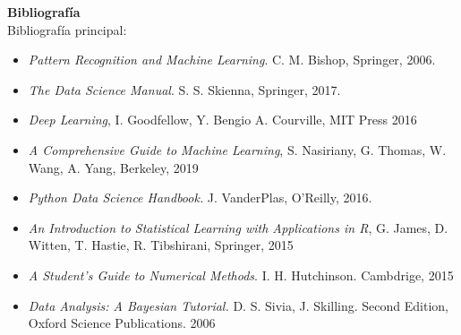 \documentclass[letterpaper,10pt,onecolumn]{article}
\begin{document}
\vspace*{0.5cm} 

\newpage
{}
\noindent\textbf{\large {} \quad
  Bibliograf\'ia}\\[-0.2cm] 



\noindent\normalsize Bibliograf\'ia principal:

\begin{itemize}


\item
\textit{Pattern Recognition and Machine Learning}. C. M. Bishop, 
Springer, 2006.\\[-0.6cm]

\item 
\textit{The Data Science Manual}. S. S. Skienna, Springer, 2017.\\[-0.6cm]

\item
\textit{Deep Learning}, I. Goodfellow, Y. Bengio A. Courville, MIT Press 2016 \\[-0.6cm]

\item
\textit{A Comprehensive Guide to Machine Learning}, S. Nasiriany, G. Thomas, W. Wang, A. Yang, 
Berkeley, 2019 \\[-0.6cm]

\item
\textit{Python Data Science Handbook.} J. VanderPlas, O'Reilly, 2016.\\[-0.6cm]

\item 
\textit{An Introduction to Statistical Learning with Applications in
  R}, G. James, D. Witten, T. Hastie, R. Tibshirani, Springer, 2015 \\[-0.6cm]

\item 
\textit{A Student's Guide to Numerical  Methods}. I. H. Hutchinson. Cambdrige, 2015 \\[-0.6cm]

\item
\textit{Data Analysis: A Bayesian Tutorial.} D. S. Sivia,
J. Skilling. Second Edition, Oxford Science Publications. 2006 \\[-0.6cm]

\end{itemize}
\end{document}
